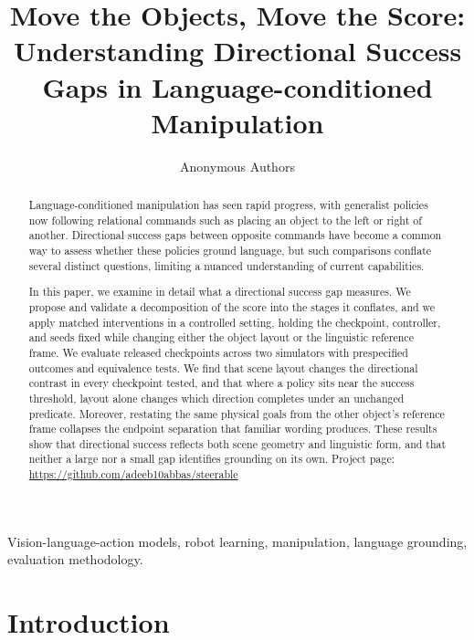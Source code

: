 \documentclass[letterpaper,10pt,conference]{ieeeconf}%
\title{Move the Objects, Move the Score: Understanding Directional Success Gaps in Language-conditioned Manipulation}
\author{%
\ifanonymous
Anonymous Authors%
\else
\AuthorBlock%
\fi
}
\begin{document}
\maketitle

\begin{abstract}
Language-conditioned manipulation has seen rapid progress, with generalist policies now following relational commands such as placing an object to the left or right of another.
Directional success gaps between opposite commands have become a common way to assess whether these policies ground language, but such comparisons conflate several distinct questions, limiting a nuanced understanding of current capabilities.

In this paper, we examine in detail what a directional success gap measures.
We propose and validate a decomposition of the score into the stages it conflates, and we apply matched interventions in a controlled setting, holding the checkpoint, controller, and seeds fixed while changing either the object layout or the linguistic reference frame.
We evaluate released checkpoints across two simulators with prespecified outcomes and equivalence tests.
We find that scene layout changes the directional contrast in every checkpoint tested, and that where a policy sits near the success threshold, layout alone changes which direction completes under an unchanged predicate.
Moreover, restating the same physical goals from the other object's reference frame collapses the endpoint separation that familiar wording produces.
These results show that directional success reflects both scene geometry and linguistic form, and that neither a large nor a small gap identifies grounding on its own.
Project page: \url{https://github.com/adeeb10abbas/steerable}
\end{abstract}

\begin{IEEEkeywords}
Vision-language-action models, robot learning, manipulation, language grounding, evaluation methodology.
\end{IEEEkeywords}

\section{Introduction}
\label{sec:introduction}
\end{document}
